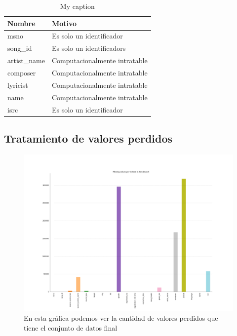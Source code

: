 \documentclass[a4paper]{article}
\begin{document}
\begin{table}[H]
\centering
\caption{My caption}
\label{my-label}
\begin{tabular}{|l|l|}
\hline
Nombre                   & Motivo \\ \hline
msno                     & Es solo un identificador \\ \hline
song\_id                 & Es solo un identificadors \\ \hline
artist\_name             & Computacionalmente intratable \\ \hline
composer                 & Computacionalmente intratable \\ \hline
lyricist                 & Computacionalmente intratable    \\ \hline
name                     & Computacionalmente intratable     \\ \hline
isrc                     & Es solo un identificador    \\ \hline
\end{tabular}
\end{table}


\subsection{Tratamiento de valores perdidos}


\begin{figure}[H]
\centering
\includegraphics[width=1\textwidth]{Images/missings.png}
\caption{En esta gráfica podemos ver la cantidad de valores perdidos que tiene el conjunto de datos final}
\end{figure}
\end{document}
